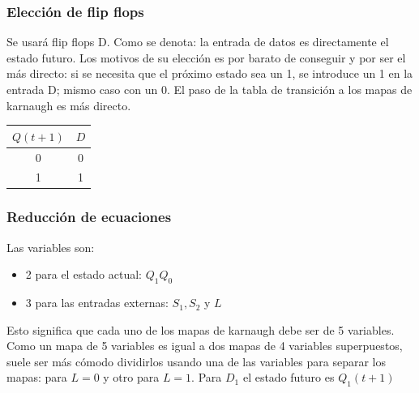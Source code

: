 \subsubsection{Elección de flip flops}
\sangria{} Se usará flip flops D. Como se denota: la entrada de datos es directamente el estado futuro. Los motivos de su elección es por barato de conseguir y por ser el más directo: si se necesita que el próximo estado sea un 1, se introduce un 1 en la entrada D; mismo caso con un 0. El paso de la tabla de transición a los mapas de karnaugh es más directo.
\begin{center}
\centering
\begin{tabular}{|c|c|}
\hline
\rowcolor[HTML]{656565} 
{\color[HTML]{FFFFFF} \textbf{$Q(t+1)$}} & {\color[HTML]{FFFFFF} \textbf{$D$}} \\ \hline
0                                        & 0                                   \\ \hline
1                                        & 1                                   \\ \hline
\end{tabular}
\end{center}
\subsubsection{Reducción de ecuaciones}
\sangria{} Las variables son:
\begin{itemize}[nosep] 
	\item 2 para el estado actual: $Q_1Q_0$
	\item 3 para las entradas externas: $S_1,S_2$ y $L$
\end{itemize}
Esto significa que cada uno de los mapas de karnaugh debe ser de 5 variables. Como un mapa de 5 variables es igual a dos mapas de 4 variables superpuestos, suele ser más cómodo dividirlos usando una de las variables para separar los mapas: para $L = 0$ y otro para $L = 1$. Para $D_1$ el estado futuro es $Q_1(t+1)$


